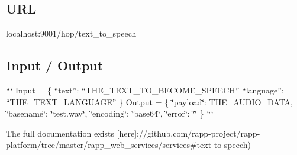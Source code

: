 \subsection*{U\-R\-L}

{\ttfamily localhost\-:9001/hop/text\-\_\-to\-\_\-speech}

\subsection*{Input / Output}

``` Input = \{ “text”\-: “\-T\-H\-E\-\_\-\-T\-E\-X\-T\-\_\-\-T\-O\-\_\-\-B\-E\-C\-O\-M\-E\-\_\-\-S\-P\-E\-E\-C\-H” “language”\-: “\-T\-H\-E\-\_\-\-T\-E\-X\-T\-\_\-\-L\-A\-N\-G\-U\-A\-G\-E” \} {\ttfamily  } Output = \{ \char`\"{}payload\char`\"{}\-: T\-H\-E\-\_\-\-A\-U\-D\-I\-O\-\_\-\-D\-A\-T\-A, \char`\"{}basename\char`\"{}\-: \char`\"{}test.\-wav\char`\"{}, \char`\"{}encoding\char`\"{}\-: \char`\"{}base64\char`\"{}, \char`\"{}error\char`\"{}\-: \char`\"{}\char`\"{} \} ```

The full documentation exists \mbox{[}here\mbox{]}\-://github.com/rapp-\/project/rapp-\/platform/tree/master/rapp\-\_\-web\-\_\-services/services\#text-\/to-\/speech) 